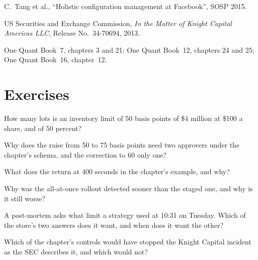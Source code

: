 \begin{omsources}
\item C.~Tang et al., ``Holistic configuration management at Facebook'', SOSP 2015.
\item US Securities and Exchange Commission, \emph{In the Matter of Knight Capital Americas LLC}, Release No.\ 34-70694, 2013.
\item One Quant Book~7, chapters 3 and 21; One Quant Book~12, chapters 24 and 25; One Quant Book~16, chapter~12.
\end{omsources}

\section{Exercises}

\begin{exercise}[$\star$]\label{exo:pl:signal-serving-and-parameter-management:1}
How many lots is an inventory limit of 50 basis points of \$4 million at \$100 a share, and of 50 percent?
\end{exercise}

\begin{exercise}[$\star$]\label{exo:pl:signal-serving-and-parameter-management:2}
Why does the raise from 50 to 75 basis points need two approvers under the chapter's schema, and the correction to 60 only one?
\end{exercise}

\begin{exercise}[$\star$]\label{exo:pl:signal-serving-and-parameter-management:3}
What does the  return at 400 seconds in the chapter's example, and why?
\end{exercise}

\begin{exercise}[$\star\star$]\label{exo:pl:signal-serving-and-parameter-management:4}
Why was the all-at-once rollout detected sooner than the staged one, and why is it still worse?
\end{exercise}

\begin{exercise}[$\star\star$]\label{exo:pl:signal-serving-and-parameter-management:5}
A post-mortem asks what limit a strategy used at 10:31 on Tuesday. Which of the store's two answers does it want, and when does it want the
other?
\end{exercise}

\begin{exercise}[$\star\star$]\label{exo:pl:signal-serving-and-parameter-management:6}
Which of the chapter's controls would have stopped the Knight Capital incident as the SEC describes it, and which would not?
\end{exercise}

